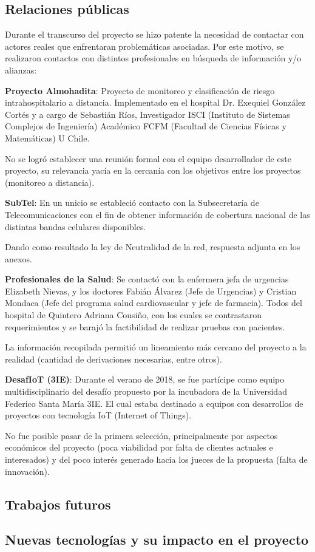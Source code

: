 \subsection{Relaciones públicas}

Durante el transcurso del proyecto se hizo patente la necesidad de contactar con actores reales que enfrentaran problemáticas asociadas. Por este motivo, se realizaron contactos con distintos profesionales en búsqueda de información y/o alianzas:

\textbf{Proyecto Almohadita}: Proyecto de monitoreo y clasificación de riesgo intrahospitalario a distancia. Implementado en el hospital Dr. Exequiel González Cortés y a cargo de Sebastián Ríos, Investigador ISCI (Instituto de Sistemas Complejos de Ingeniería) Académico FCFM (Facultad de Ciencias Físicas y Matemáticas) U Chile. 

No se logró establecer una reunión formal con el equipo desarrollador de este proyecto, su relevancia yacía en la cercanía con los objetivos entre los proyectos (monitoreo a distancia).

\textbf{SubTel}: En un unicio se estableció contacto con la Subsecretaría de Telecomunicaciones con el fin de obtener información de cobertura nacional de las distintas bandas celulares disponibles. 

Dando como resultado la ley de Neutralidad de la red, respuesta adjunta en los anexos.

\textbf{Profesionales de la Salud}: Se contactó con la enfermera jefa de urgencias Elizabeth Nievas, y los doctores Fabián Álvarez (Jefe de Urgencias) y Cristian Mondaca (Jefe del programa salud cardiovascular y jefe de farmacia). Todos del hospital de Quintero Adriana Cousiño, con los cuales se contrastaron requerimientos y se barajó la factibilidad de realizar pruebas con pacientes.

La información recopilada permitió un lineamiento más cercano del proyecto a la realidad (cantidad de derivaciones necesarias, entre otros).

\newpage

\textbf{DesafIoT (3IE)}: Durante el verano de 2018, se fue partícipe como equipo multidisciplinario del desafío propuesto por la incubadora de la Universidad Federico Santa María 3IE. El cual estaba destinado a equipos con desarrollos de proyectos con tecnología IoT (Internet of Things). 

No fue posible pasar de la primera selección, principalmente por aspectos económicos del proyecto (poca viabilidad por falta de clientes actuales e interesados) y del poco interés generado hacia los jueces de la propuesta (falta de innovación).

\subsection{Trabajos futuros}



\subsection{Nuevas tecnologías y su impacto en el proyecto}

